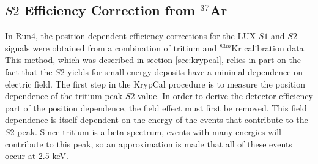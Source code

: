 {\subsection{$S2$ Efficiency Correction from $^{37}$Ar}\label{sec:s2corr}
In Run4, the position-dependent efficiency corrections for the LUX $S1$ and $S2$ signals were obtained from a combination of tritium and $^{83m}$Kr calibration data. This method, which was described in section \ref{sec:krypcal}, relies in part on the fact that the $S2$ yields for small energy deposits have a minimal dependence on electric field. The first step in the KrypCal procedure is to measure the position dependence of the tritium peak $S2$ value. In order to derive the detector efficiency part of the position dependence, the field effect must first be removed. This field dependence is itself dependent on the energy of the events that contribute to the $S2$ peak. Since tritium is a beta spectrum, events with many energies will contribute to this peak, so an approximation is made that all of these events occur at 2.5 keV.

}
